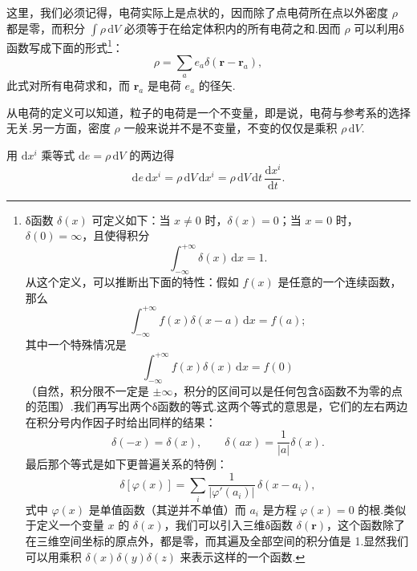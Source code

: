这里，我们必须记得，电荷实际上是点状的，因而除了点电荷所在点以外密度 $\rho$
都是零，而积分 $\int\rho\,\mathrm{d}V$
必须等于在给定体积内的所有电荷之和.因而 $\rho$ 可以利用δ函数写成下面的形式\footnote{δ函数 $\delta(x)$ 可定义如下：当 $x\neq 0$ 时，$\delta(x)=0$；当 $x=0$ 时，$\delta(0)=\infty$，且使得积分
\begin{equation*}\tag{1}
  \int_{-\infty}^{+\infty}\delta(x)\,\mathrm{d}x=1.
\end{equation*}
从这个定义，可以推断出下面的特性：假如 $f(x)$ 是任意的一个连续函数，那么
\begin{equation*}\tag{2}
  \int_{-\infty}^{+\infty}f(x)\delta(x-a)\,\mathrm{d}x=f(a);
\end{equation*}
其中一个特殊情况是
\begin{equation*}\tag{3}
  \int_{-\infty}^{+\infty}f(x)\delta(x)\,\mathrm{d}x=f(0)
\end{equation*}
（自然，积分限不一定是 $\pm\infty$，积分的区间可以是任何包含δ函数不为零的点的范围）.我们再写出两个δ函数的等式.这两个等式的意思是，它们的左右两边在积分号内作因子时给出同样的结果：
\begin{equation*}\tag{4}
  \delta(-x)=\delta(x),\qquad \delta(ax)=\frac{1}{|a|}\delta(x).
\end{equation*}
最后那个等式是如下更普遍关系的特例：
\begin{equation*}\tag{5}
  \delta[\varphi(x)]=\sum_i\frac{1}{|\varphi'(a_i)|}\,\delta(x-a_i),
\end{equation*}
式中 $\varphi(x)$ 是单值函数（其逆并不单值）而 $a_i$ 是方程 $\varphi(x)=0$ 的根.类似于定义一个变量 $x$ 的 $\delta(x)$，我们可以引入三维δ函数 $\delta(\boldsymbol{r})$，这个函数除了在三维空间坐标的原点外，都是零，而其遍及全部空间的积分值是 1.显然我们可以用乘积 $\delta(x)\delta(y)\delta(z)$ 来表示这样的一个函数.}：
\begin{equation}
  \rho=\sum_a e_a\delta(\boldsymbol{r}-\boldsymbol{r}_a),
\end{equation}
此式对所有电荷求和，而 $\boldsymbol{r}_a$ 是电荷 $e_a$ 的径矢.

从电荷的定义可以知道，粒子的电荷是一个不变量，即是说，电荷与参考系的选择无关.另一方面，密度 $\rho$
一般来说并不是不变量，不变的仅仅是乘积 $\rho\,\mathrm{d}V$.

用 $\mathrm{d}x^i$ 乘等式 $\mathrm{d}e=\rho\,\mathrm{d}V$ 的两边得
\begin{equation*}
  \mathrm{d}e\,\mathrm{d}x^i
  =\rho\,\mathrm{d}V\,\mathrm{d}x^i
  =\rho\,\mathrm{d}V\,\mathrm{d}t\,\frac{\mathrm{d}x^i}{\mathrm{d}t}.
\end{equation*}

